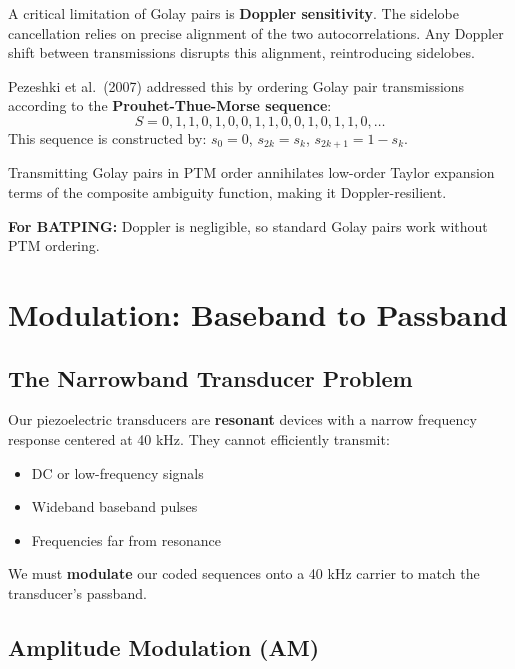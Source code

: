 \documentclass[11pt]{article}
\begin{document}
A critical limitation of Golay pairs is \textbf{Doppler sensitivity}. The sidelobe cancellation relies on precise alignment of the two autocorrelations. Any Doppler shift between transmissions disrupts this alignment, reintroducing sidelobes.

Pezeshki et al.\ (2007) addressed this by ordering Golay pair transmissions according to the \textbf{Prouhet-Thue-Morse sequence}:
\begin{equation}
S = 0, 1, 1, 0, 1, 0, 0, 1, 1, 0, 0, 1, 0, 1, 1, 0, \ldots
\end{equation}
This sequence is constructed by: $s_0 = 0$, $s_{2k} = s_k$, $s_{2k+1} = 1 - s_k$.

Transmitting Golay pairs in PTM order annihilates low-order Taylor expansion terms of the composite ambiguity function, making it Doppler-resilient.

\textbf{For BATPING:} Doppler is negligible, so standard Golay pairs work without PTM ordering.

\section{Modulation: Baseband to Passband}

\subsection{The Narrowband Transducer Problem}

Our piezoelectric transducers are \textbf{resonant} devices with a narrow frequency response centered at 40 kHz. They cannot efficiently transmit:
\begin{itemize}
    \item DC or low-frequency signals
    \item Wideband baseband pulses
    \item Frequencies far from resonance
\end{itemize}

We must \textbf{modulate} our coded sequences onto a 40 kHz carrier to match the transducer's passband.

\subsection{Amplitude Modulation (AM)}
\end{document}
